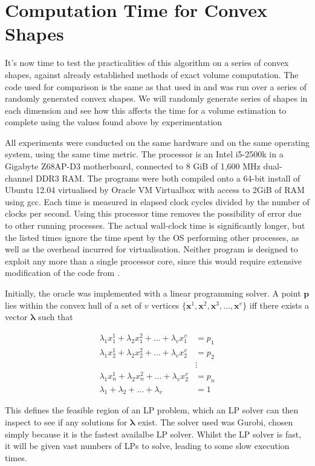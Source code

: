 \section{Computation Time for Convex Shapes}\label{sec_time}

It's now time to test the practicalities of this algorithm on a series of convex shapes, against already established methods of exact volume computation. The code used for comparison is the same as that used in \cite{Bueler98}
and was run over a series of randomly generated convex shapes. We will randomly generate series of shapes in each dimension and see how this affects the time for a volume estimation to complete using the values found above by experimentation

All experiments were conducted on the same hardware and on the same operating system, using the same time metric. The processor is an Intel i5-2500k in a Gigabyte Z68AP-D3 motherboard, connected to 8 GiB of 1,600 MHz dual-channel DDR3 RAM. The programs were both compiled onto a 64-bit install of Ubuntu 12.04 virtualised by Oracle VM Virtualbox with access to 2GiB of RAM using gcc. Each time is measured in elapsed clock cycles divided by the number of clocks per second. Using this processor time removes the possibility of error due to other running processes. The actual wall-clock time is significantly longer, but the listed times ignore the time spent by the OS performing other processes, as well as the overhead incurred for virtualisation. Neither program is designed to exploit any more than a single processor core, since this would require extensive modification of the code from \cite{Bueler98}.

Initially, the oracle was implemented with a linear programming solver. A point ${\bm p}$ lies within the convex hull of a set of $v$ vertices $\{{\bm x}^1, {\bm x}^2, {\bm x}^3, ..., {\bm x}^v\}$ iff there exists a vector ${\bm \lambda}$ such that

\begin{align*}
\lambda_1 x^1_1 + \lambda_2 x^2_1 + ... + \lambda_v x^v_1 &= p_1 \\
\lambda_1 x^1_2 + \lambda_2 x^2_2 + ... + \lambda_v x^v_2 &= p_2 \\
&\vdots \\
\lambda_1 x^1_n + \lambda_2 x^2_n + ... + \lambda_v x^v_2 &= p_n \\
\lambda_1 + \lambda_2 + ... + \lambda_v &= 1
\end{align*}

This defines the feasible region of an LP problem, which an LP solver can then inspect to see if any solutions for ${\bm \lambda}$ exist. The solver used was Gurobi, chosen simply because it is the fastest availalbe LP solver. Whilst the LP solver is fast, it will be given vast numbers of LPs to solve, leading to some slow execution times.

